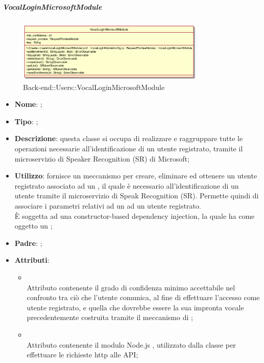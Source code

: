 \hypertarget{VocalLoginMicrosoftModule_label}{\subparagraph{VocalLoginMicrosoftModule}}
\begin{figure}[h]
	\centering
	\includegraphics[width=0.80\textwidth,height=\textheight,keepaspectratio]{images/ClassVocalLoginMicrosoftModule.png}
	\caption{Back-end::Users::VocalLoginMicrosoftModule}
\end{figure}
\begin{itemize}
	\item \textbf{Nome}: ;
	\item \textbf{Tipo}: ;
	\item \textbf{Descrizione}: questa classe si occupa di realizzare e raggruppare tutte le operazioni necessarie all'identificazione di un utente registrato, tramite il microservizio di Speaker Recognition (SR) di Microsoft;
	\item \textbf{Utilizzo}: fornisce un meccanismo per creare, eliminare ed ottenere un utente registrato associato ad un , il quale è necessario all'identificazione di un utente tramite il microservizio di Speak Recognition (SR). Permette quindi di associare i parametri relativi ad un  ad un utente registrato.\\
È soggetta ad una constructor-based dependency injection, la quale ha come oggetto un ;
	\item \textbf{Padre}: ;
	\item \textbf{Attributi}:
	\begin{itemize}
		\item[]  \\
		Attributo contenente il grado di confidenza minimo accettabile nel confronto tra ciò che l'utente comunica, al fine di effettuare l'accesso come utente registrato, e quella che dovrebbe essere la sua impronta vocale precedentemente costruita tramite il meccanismo di ;
		\item[]  \\
		Attributo contenente il modulo Node.js , utilizzato dalla classe per effettuare le richieste http alle API;

\end{itemize}
\end{itemize}
